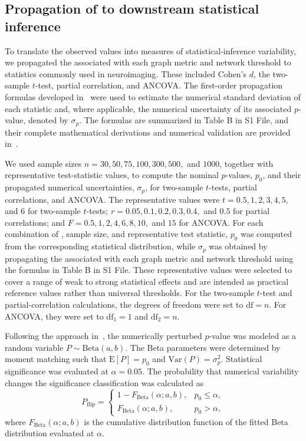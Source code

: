 \subsection{Propagation of \npvratio{} to downstream statistical inference}

To translate the observed \npvratio{} values into measures of statistical-inference variability, we propagated the \npvratio{} associated with each graph metric and network threshold to statistics commonly used in neuroimaging. These included Cohen's \(d\), the two-sample \(t\)-test, partial correlation, and ANCOVA. The first-order propagation formulas developed in~\cite{Yohan2025NPVR} were used to estimate the numerical standard deviation of each statistic and, where applicable, the numerical uncertainty of its associated \(p\)-value, denoted by \(\sigma_p\). The formulas are summarized in Table B in S1 File, and their complete mathematical derivations and numerical validation are provided in~\cite{Yohan2025NPVR}.

We used sample sizes \(n=30, 50, 75, 100, 300, 500,\) and \(1000\), together with representative test-statistic values, to compute the nominal \(p\)-values, \(p_0\), and their propagated numerical uncertainties, \(\sigma_p\), for two-sample \(t\)-tests, partial correlations, and ANCOVA. The representative values were \(t=0.5, 1, 2, 3, 4, 5,\) and \(6\) for two-sample \(t\)-tests; \(r=0.05, 0.1, 0.2, 0.3, 0.4,\) and \(0.5\) for partial correlations; and \(F=0.5, 1, 2, 4, 6, 8, 10,\) and \(15\) for ANCOVA. For each combination of \npvratio{}, sample size, and representative test statistic, \(p_0\) was computed from the corresponding statistical distribution, while \(\sigma_p\) was obtained by propagating the \npvratio{} associated with each graph metric and network threshold using the formulas in Table B in S1 File. These representative values were selected to cover a range of weak to strong statistical effects and are intended as practical reference values rather than universal thresholds. For the two-sample \(t\)-test and partial-correlation calculations, the degrees of freedom were set to \(\mathrm{df}=n\). For ANCOVA, they were set to \(\mathrm{df}_1=1\) and \(\mathrm{df}_2=n\).

Following the approach in~\cite{Yohan2025NPVR}, the numerically perturbed \(p\)-value was modeled as a random variable \(P\sim\mathrm{Beta}(a,b)\). The Beta parameters were determined by moment matching such that \(\mathrm{E}[P]=p_0\) and \(\mathrm{Var}(P)=\sigma_p^2\). Statistical significance was evaluated at \(\alpha=0.05\). The probability that numerical variability changes the significance classification was calculated as
\begin{equation}
P_{\mathrm{flip}}=
\begin{cases}
1-F_{\mathrm{Beta}}(\alpha;a,b), & p_0\leq\alpha,\\[4pt]
F_{\mathrm{Beta}}(\alpha;a,b), & p_0>\alpha,
\end{cases}
\end{equation}
where \(F_{\mathrm{Beta}}(\alpha;a,b)\) is the cumulative distribution function of the fitted Beta distribution evaluated at \(\alpha\).


